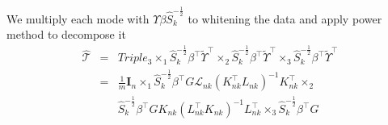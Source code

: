 \documentclass{article}
\begin{document}
We multiply each mode with $\Upsilon \beta \widehat{S}_k^{-\frac{1}{2}}$ to
whitening the data and apply power method to decompose it
%
\begin{eqnarray*}
\widehat{\mathcal{T}} &=& Triple_3 \times_1 \widehat{S}_k^{-\frac{1}{2}}\beta^\top\widetilde\Upsilon^\top \times_2
\widehat{S}_k^{-\frac{1}{2}}\beta^\top\widetilde\Upsilon^\top \times_3 \widehat{S}_k^{-\frac{1}{2}}\beta^\top\widetilde\Upsilon^\top\\
&=& \frac{1}{m}\bm{I}_n \times_1
\widehat{S}_k^{-\frac{1}{2}}\beta^\top{G}\mathcal{L}_{nk}({K}_{nk}^\top
{L}_{nk})^{-1}{K}_{nk}^\top \times_2\\
&&\widehat{S}_k^{-\frac{1}{2}}\beta^\top{G}{K}_{nk}({L}_{nk}^\top
{K}_{nk})^{-1}{L}_{nk}^\top \times_3
\widehat{S}_k^{-\frac{1}{2}}\beta^\top{G}
\end{eqnarray*}
%



\end{document}
